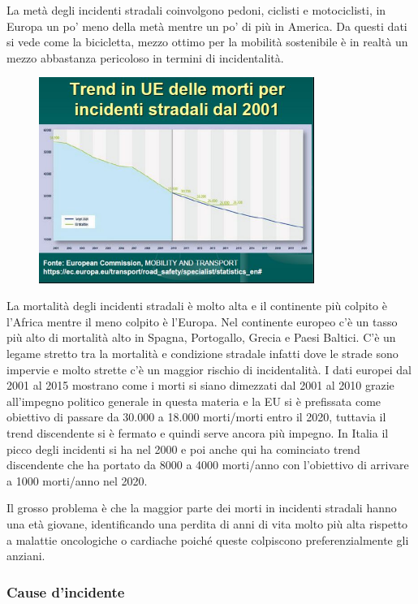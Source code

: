 La metà degli incidenti stradali coinvolgono pedoni, ciclisti e
motociclisti, in Europa un po' meno della metà mentre un po' di più in
America. Da questi dati si vede come la bicicletta, mezzo ottimo per la
mobilità sostenibile è in realtà un mezzo abbastanza pericoloso in
termini di incidentalità.

\begin{figure}[!ht]
\centering
	\includegraphics[width=0.8\textwidth]{28/image5.jpg}
	\end{figure}

La
mortalità degli incidenti stradali è molto alta e il continente più
colpito è l'Africa mentre il meno colpito è l'Europa. Nel continente
europeo c'è un tasso più alto di mortalità alto in Spagna, Portogallo,
Grecia e Paesi Baltici. C'è un legame stretto tra la mortalità e
condizione stradale infatti dove le strade sono impervie e molto strette
c'è un maggior rischio di incidentalità. I dati europei dal 2001 al 2015
mostrano come i morti si siano dimezzati dal 2001 al 2010 grazie
all'impegno politico generale in questa materia e la EU si è prefissata
come obiettivo di passare da 30.000 a 18.000 morti/morti entro il 2020,
tuttavia il trend discendente si è fermato e quindi serve ancora più
impegno. In Italia il picco degli incidenti si ha nel 2000 e poi anche
qui ha cominciato trend discendente che ha portato da 8000 a 4000
morti/anno con l'obiettivo di arrivare a 1000 morti/anno nel 2020.

Il grosso problema è che la maggior parte dei morti in incidenti
stradali hanno una età giovane, identificando una perdita di anni di
vita molto più alta rispetto a malattie oncologiche o cardiache poiché
queste colpiscono preferenzialmente gli anziani.

\subsubsection{Cause d'incidente}

